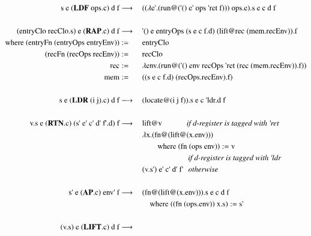 \documentclass[a4paper,12pt,twoside,openright]{report}
\theoremstyle{definition}
\newcommand{\ts}{\textquotesingle}
\begin{document}
\begingroup
\allowdisplaybreaks
\begin{figure}[htp!]
\centering
\begin{alignat}{5}
		\text{s e (} \mathbf{LDF} \text{ ops.c) d f} & \longrightarrow \: && \text{(($\lambda$e{\ts}.(run@({\ts}() e{\ts} ops {\ts}ret f))) ops.e).s e c d f} \label{eq:secd_sem_ldf} \\
		\nonumber \\%
		\text{(entryClo recClo.s) e (} \mathbf{RAP}\text{.c) d f} & \longrightarrow \: && \text{{\ts}() e entryOps (s e c f.d) (lift@rec (mem.recEnv)).f} \label{eq:secd_sem_rap} \\
		\text{where (entryFn (entryOps entryEnv))} & := && \text{entryClo} \nonumber \\
		\text{(recFn (recOps recEnv))} & := && \text{recClo} \nonumber \\
		\text{rec} & := && \text{$\lambda$env.(run@({\ts}() env recOps {\ts}ret (rec (mem.recEnv)).f))} \nonumber \\
		\text{mem} & := && \text{((s e c f.d) (recOps.recEnv).f)} \nonumber \\
		\nonumber \\%
		\text{s e (} \mathbf{LDR} \text{ (i j).c) d f} & \longrightarrow \: && \text{(locate@(i j f)).s e c {\ts}ldr.d f} \\
		\nonumber \\%
		\text{v.s e (} \mathbf{RTN}\text{.c) (s{\ts} e{\ts} c{\ts}  d{\ts}  f{\ts}.d) f} & \longrightarrow \:
		 && \text{lift@v} \qquad\quad\:\text{\textit{if d-register is tagged with {\ts}ret}}	\\
		 & && \text{$\lambda$x.(fn@(lift@(x.env)))} \nonumber \\
		 & && \qquad\text{where (fn (ops env))} := \text{v} \nonumber \\
		 & && \qquad\qquad\qquad\text{\textit{if d-register is tagged with {\ts}ldr}} \nonumber \\
 		 & && \text{(v.s{\ts})  e{\ts}  c{\ts}  d{\ts}  f{\ts}}	\:\:\:\text{\textit{otherwise}} \nonumber \\
 		\nonumber \\%
		\text{s{\ts} e (} \mathbf{AP}\text{.c) env{\ts} f} & \longrightarrow \: && \text{(fn@(lift@(x.env))).s e c d f} \\
		& && \quad\text{where ((fn (ops.env)) x.s)} := \text{s{\ts}} \nonumber \\
		\nonumber \\%
		\text{(v.s) e (} \mathbf{LIFT}\text{.c) d f} & \longrightarrow \: \label{eq:secd_sem_lift}

\end{alignat}
\end{figure}
\end{document}
